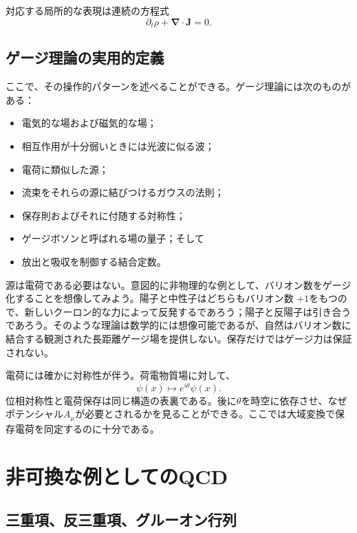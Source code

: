 対応する局所的な表現は連続の方程式
\begin{equation}
\partial_t\rho+\boldsymbol\nabla\cdot\boldsymbol J=0.
\label{eq:l5-continuity}
\end{equation}

\subsection{ゲージ理論の実用的定義}

ここで、その操作的パターンを述べることができる。ゲージ理論には次のものがある：
\begin{itemize}
\item 電気的な場および磁気的な場；
\item 相互作用が十分弱いときには光波に似る波；
\item 電荷に類似した源；
\item 流束をそれらの源に結びつけるガウスの法則；
\item 保存則およびそれに付随する対称性；
\item ゲージボソンと呼ばれる場の量子；そして
\item 放出と吸収を制御する結合定数。
\end{itemize}
源は電荷である必要はない。意図的に非物理的な例として、バリオン数をゲージ化することを想像してみよう。陽子と中性子はどちらもバリオン数
\(+1\)をもつので、新しいクーロン的な力によって反発するであろう；陽子と反陽子は引き合うであろう。そのような理論は数学的には想像可能であるが、自然はバリオン数に結合する観測された長距離ゲージ場を提供しない。保存だけではゲージ力は保証されない。

電荷には確かに対称性が伴う。荷電物質場に対して、
\begin{equation}
\psi(x)\longmapsto e^{i\theta}\psi(x).
\label{eq:l5-u1}
\end{equation}
位相対称性と電荷保存は同じ構造の表裏である。後に\(\theta\)を時空に依存させ、なぜポテンシャル\(A_\mu\)が必要とされるかを見ることができる。ここでは大域変換で保存電荷を同定するのに十分である。

\section{非可換な例としてのQCD}

\subsection{三重項、反三重項、グルーオン行列}


